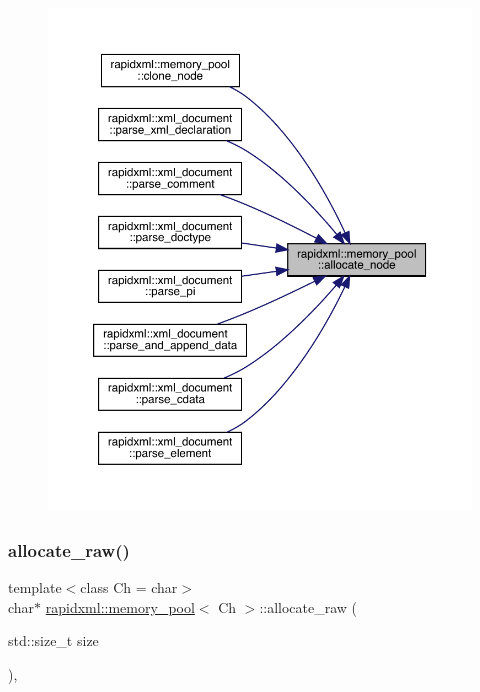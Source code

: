 \begin{figure}[H]
\begin{center}
\leavevmode
\includegraphics[width=350pt]{classrapidxml_1_1memory__pool_a4118581c29ee9a2f6b55ebf7dac185f8_icgraph}
\end{center}
\end{figure}
\mbox{\label{classrapidxml_1_1memory__pool_a1aed504a747303352e05f61c6ccbbebb}} 
\subsubsection{\texorpdfstring{allocate\_raw()}{allocate\_raw()}}
{\footnotesize\ttfamily template$<$class Ch  = char$>$ \\
char$\ast$ \mbox{\hyperlink{classrapidxml_1_1memory__pool}{rapidxml\+::memory\+\_\+pool}}$<$ Ch $>$\+::allocate\+\_\+raw (\begin{DoxyParamCaption}\item[{std\+::size\+\_\+t}]{size }\end{DoxyParamCaption})\hspace{0.3cm}{\ttfamily [inline]}, {\ttfamily [private]}}

